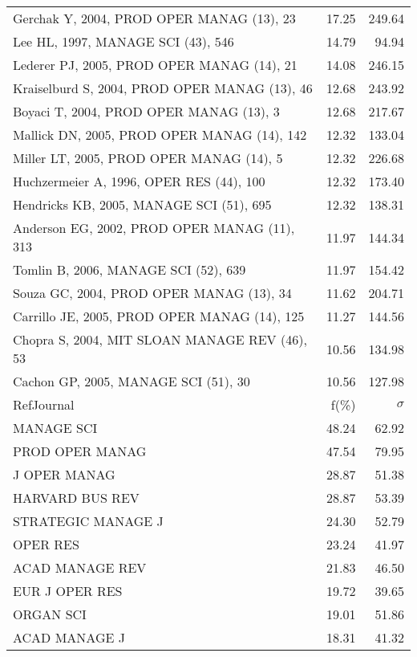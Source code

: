 \documentclass[a4paper,11pt]{report}
\begin{document}
\begin{landscape}
\begin{table}[!ht]
{\begin{tabular}{|l r r|}
Gerchak Y, 2004, PROD OPER MANAG (13), 23 & 17.25 & 249.64\\
Lee HL, 1997, MANAGE SCI (43), 546 & 14.79 & 94.94\\
Lederer PJ, 2005, PROD OPER MANAG (14), 21 & 14.08 & 246.15\\
Kraiselburd S, 2004, PROD OPER MANAG (13), 46 & 12.68 & 243.92\\
Boyaci T, 2004, PROD OPER MANAG (13), 3 & 12.68 & 217.67\\
Mallick DN, 2005, PROD OPER MANAG (14), 142 & 12.32 & 133.04\\
Miller LT, 2005, PROD OPER MANAG (14), 5 & 12.32 & 226.68\\
Huchzermeier A, 1996, OPER RES (44), 100 & 12.32 & 173.40\\
Hendricks KB, 2005, MANAGE SCI (51), 695 & 12.32 & 138.31\\
Anderson EG, 2002, PROD OPER MANAG (11), 313 & 11.97 & 144.34\\
Tomlin B, 2006, MANAGE SCI (52), 639 & 11.97 & 154.42\\
Souza GC, 2004, PROD OPER MANAG (13), 34 & 11.62 & 204.71\\
Carrillo JE, 2005, PROD OPER MANAG (14), 125 & 11.27 & 144.56\\
Chopra S, 2004, MIT SLOAN MANAGE REV (46), 53 & 10.56 & 134.98\\
Cachon GP, 2005, MANAGE SCI (51), 30 & 10.56 & 127.98\\
\hline
\hline
RefJournal & f(\%) & $\sigma$\\
\hline
MANAGE SCI & 48.24 & 62.92\\
PROD OPER MANAG & 47.54 & 79.95\\
J OPER MANAG & 28.87 & 51.38\\
HARVARD BUS REV & 28.87 & 53.39\\
STRATEGIC MANAGE J & 24.30 & 52.79\\
OPER RES & 23.24 & 41.97\\
ACAD MANAGE REV & 21.83 & 46.50\\
EUR J OPER RES & 19.72 & 39.65\\
ORGAN SCI & 19.01 & 51.86\\
ACAD MANAGE J & 18.31 & 41.32\\
\hline
\end{tabular}
}
\end{table}

\clearpage


\end{landscape}
\end{document}
